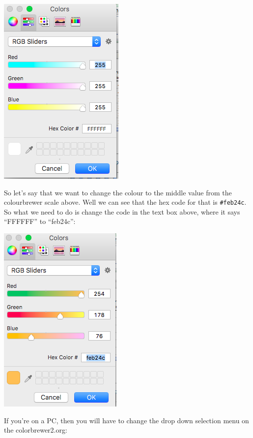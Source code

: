 \documentclass[]{book}
\theoremstyle{definition}
\theoremstyle{definition}
\theoremstyle{definition}
\theoremstyle{remark}
\begin{document}
\includegraphics{imgs/manual_fill_4.png}

So let's say that we want to change the colour to the middle value from
the colourbrewer scale above. Well we can see that the hex code for that
is \texttt{\#feb24c}. So what we need to do is change the code in the
text box above, where it says ``FFFFFF'' to ``feb24c'':

\includegraphics{imgs/manual_fill_5.png}

If you're on a PC, then you will have to change the drop down selection
menu on the colorbrewer2.org:
\end{document}
